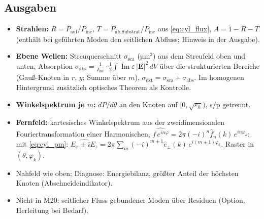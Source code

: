\subsection{Ausgaben}
\begin{itemize}[nosep]
  \item \textbf{Strahlen:} $R=P_{\text{auf}}/P_{\text{inc}}$, $T=P_{\text{ab,Substrat}}/P_{\text{inc}}$ aus \eqref{eq:cyl_flux},
        $A=1-R-T$ (enthält bei geführten Moden den seitlichen Abfluss; Hinweis in der Ausgabe).
  \item \textbf{Ebene Wellen:} Streuquerschnitt $\sigma_{\text{sca}}$ (µm$^2$) aus dem Streufeld oben und unten,
        Absorption $\sigma_{\text{abs}}=\tfrac1{I_{\text{inc}}}\cdot\tfrac12\int\operatorname{Im}\varepsilon\,|\mathbf E|^2\,dV$ über die
        strukturierten Bereiche (Gauß-Knoten in $r$, $y$; Summe über $m$), $\sigma_{\text{ext}}=\sigma_{\text{sca}}+\sigma_{\text{abs}}$.
        Im homogenen Hintergrund zusätzlich optisches Theorem als Kontrolle.
  \item \textbf{Winkelspektrum je $m$:} $dP/d\theta$ an den Knoten auf $[0,\sqrt{\varepsilon_h})$, s/p getrennt.
  \item \textbf{Fernfeld:} kartesisches Winkelspektrum aus der zweidimensionalen Fouriertransformation einer Harmonischen,
        $\widehat{f\,e^{in\varphi}}=2\pi(-i)^n\hat f_n(k)\,e^{in\varphi_k}$; mit \eqref{eq:cyl_pm}:
        $\widehat{E_x\pm iE_z}=2\pi\sum_m(-i)^{m\pm1}\hat e_\pm(k)\,e^{i(m\pm1)\varphi_k}$. Raster in $(\theta,\varphi_k)$.
  \item Nahfeld wie oben; Diagnose: Energiebilanz, größter Anteil der höchsten Knoten (Abschneideindikator).
  \item Nicht in M20: seitlicher Fluss gebundener Moden über Residuen (Option, Herleitung bei Bedarf).
\end{itemize}

